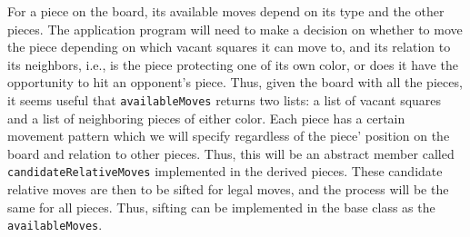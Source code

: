 For a piece on the board, its available moves depend on its type and the other pieces. The application program will need to make a decision on whether to move the piece depending on which vacant squares it can move to, and its relation to its neighbors, i.e., is the piece protecting one of its own color, or does it have the opportunity to hit an opponent's piece. Thus, given the board with all the pieces, it seems useful that \lstinline{availableMoves} returns two lists: a list of vacant squares and a list of neighboring pieces of either color. Each piece has a certain movement pattern which we will specify regardless of the piece' position on the board and relation to other pieces. Thus, this will be an abstract member called \lstinline{candidateRelativeMoves} implemented in the derived pieces. These candidate relative moves are then to be sifted for legal moves, and the process will be the same for all pieces. Thus, sifting can be implemented in the base class as the \lstinline{availableMoves}.

